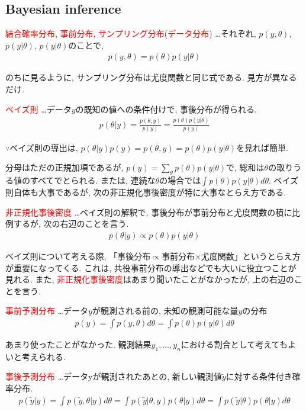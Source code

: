 \documentclass[11pt,a4pape,dvipdfmx]{jarticle}
\newcommand{\eqn}[1]{\begin{align*}#1\end{align*}}
\newcommand{\tcr}[1]{\textcolor{red}{#1}}
\begin{document}
\subsection{Bayesian inference}
\begin{itembox}[l]{\tcr{結合確率分布}, \tcr{事前分布}, \tcr{サンプリング分布}(\tcr{データ分布})}
…それぞれ, $p(y,\theta)$, $p(y|\theta)$, $p(y|\theta)$のことで,
\eqn{p(y,\theta)=p(\theta)p(y|\theta)}
\end{itembox}

のちに見るように, サンプリング分布は尤度関数と同じ式である.
見方が異なるだけ.


\begin{itembox}[l]{\tcr{ベイズ則}}
…データ$y$の既知の値への条件付けで, 事後分布が得られる.
\eqn{p(\theta|y)=\tfrac{p(\theta,y)}{p(y)}=\tfrac{p(\theta)p(y|\theta)}{p(y)}}
\end{itembox}

$\because$ベイズ則の導出は, $p(\theta|y)p(y)=p(\theta,y)=p(\theta)p(y|\theta)$を見れば簡単.

分母はただの正規加項であるが, $p(y)=\sum_{\theta}p(\theta)p(y|\theta)$で, 総和は$\theta$の取りうる値のすべてでとられる.
または, 連続な$\theta$の場合では$\int p(\theta)p(y|\theta)d\theta$.
ベイズ則自体も大事であるが, 次の非正規化事後密度が特に大事なとらえ方である.


\begin{itembox}[l]{\tcr{非正規化事後密度}}
…ベイズ則の解釈で, 事後分布が事前分布と尤度関数の積に比例するが, 次の右辺のことを言う.
\eqn{p(\theta|y)\propto p(\theta)p(y|\theta)}
\end{itembox}

ベイズ則について考える際, 「事後分布$\propto$事前分布$\times$尤度関数」というとらえ方が重要になってくる.
これは, 共役事前分布の導出などでも大いに役立つことが見れる.
また, \tcr{非正規化事後密度}はあまり聞いたことがなかったが, 上の右辺のことを言う.


\begin{itembox}[l]{\tcr{事前予測分布}}
…データ$y$が観測される前の, 未知の観測可能な量$y$の分布
\eqn{p(y)=\int p(y,\theta)d\theta=\int p(\theta)p(y|\theta)d\theta}
\end{itembox}

あまり使ったことがなかった.
観測結果$y_1,\dots,y_n$における割合として考えてもよいと考えられる.


\begin{itembox}[l]{\tcr{事後予測分布}}
…データyが観測されたあとの, 新しい観測値$\tilde{y}$に対する条件付き確率分布.
\eqn{p(\tilde{y}|y)=\int p(\tilde{y},\theta|y)d\theta=\int p(\tilde{y}|\theta,y)p(\theta|y)d\theta=\int p(\tilde{y}|\theta)p(\theta|y)d\theta}
\end{itembox}
\end{document}
